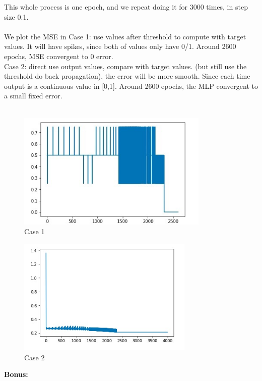 \documentclass[a4paper]{article}
\begin{document}
This whole process is one epoch, and we repeat doing it for 3000 times, in step size 0.1.\\\\
We plot the MSE in Case 1: use values after threshold to compute with target values. It will have spikes, since both of values only have 0/1. Around 2600 epochs, MSE convergent to 0 error.\\
Case 2: direct use output values, compare with target values. (but still use the threshold do back propagation), the error will be more smooth. Since each time output is a continuous value in [0,1]. Around 2600 epochs, the MLP convergent to a small fixed error.\\\\
\begin{figure}[h]
  \centering
    \includegraphics[height = 2.2in]{case1.JPG}
    \caption{Case 1}
\end{figure}
\begin{figure}[h]
  \centering
    \includegraphics[height = 2.2in]{case2.JPG}
    \caption{Case 2}
\end{figure}
\newpage
\textbf{Bonus:}\\
\end{document}
